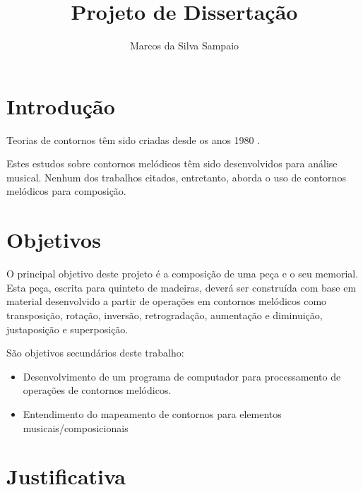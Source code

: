 \documentclass{article}
\begin{document}
\title{Projeto de Dissertação}
\author{Marcos da Silva Sampaio}
\maketitle

\thispagestyle{empty}

\setlength{\parindent}{0cm}

\section{Introdução}
\label{sec:introducao}




Teorias de contornos têm sido criadas desde os anos 1980
\cite{friedmann85:_method_discus_contour,friedmann1987rmc,marvin87:_relat_music_contour,polansky92:_possib_impos_melod,quinn97:_fuzzy_exten_theor_contour}.


Estes estudos sobre contornos melódicos têm sido desenvolvidos para
análise musical. Nenhum dos trabalhos citados, entretanto, aborda o
uso de contornos melódicos para composição.

\section{Objetivos}
\label{sec:objetivos}

O principal objetivo deste projeto é  a composição de uma peça e o seu
memorial.  Esta peça, escrita  para quinteto  de madeiras,  deverá ser
construída com base em material  desenvolvido a partir de operações em
contornos    melódicos   como    transposição,    rotação,   inversão,
retrogradação, aumentação e diminuição, justaposição e superposição.

São objetivos secundários deste trabalho:

\begin{itemize}
\item Desenvolvimento de um programa de computador para processamento
  de operações de contornos melódicos.
\item Entendimento do mapeamento de contornos para elementos
  musicais/composicionais
\end{itemize}

\section{Justificativa}
\label{sec:justificativa}
\end{document}
